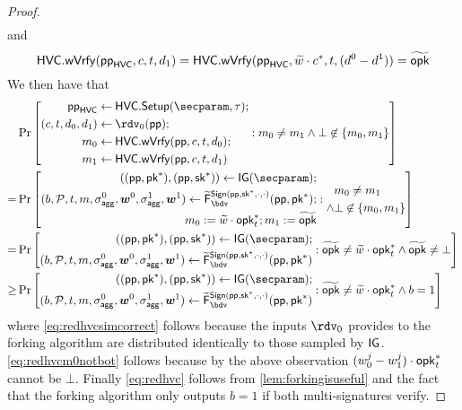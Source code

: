 \begin{proof}
\begin{align*}
  \end{align*}
  and
  \[
    \mathsf{HVC}.\mathsf{wVrfy}(\mathsf{pp}_{\mathsf{HVC}},c,t,d_1) = \mathsf{HVC}.\mathsf{wVrfy}(\mathsf{pp}_{\mathsf{HVC}},\widetilde w\cdot c^*,t,(d^0-d^1)) = \widetilde{\mathsf{opk}}
  \]
  We then have that
    \begin{align}
    &\Pr\left[
      \begin{aligned}
      \hvcparams\gets&\mspace{\medmuskip}\hvc.\setup(\secparam,\tau);\\
      (c,t,d_0,d_1) \gets&\mspace{\medmuskip} \rdv_0(\params);\\
      m_0 \gets&\mspace{\medmuskip} \hvc.\wverify(\params,c,t,d_0);\\
      m_1 \gets&\mspace{\medmuskip} \hvc.\wverify(\params,c,t,d_1)
      \end{aligned}:
      m_0\neq m_1 \land\bot\not\in\{m_0,m_1\}
    \right]\notag\\
    =&\Pr\left[
      \begin{aligned}
      ((\params,\pk^*),(\params,\sk^*)) \gets \IG(\secparam);\\
      (b,\pubkeys,t,m,\aggsig^0,\vec{w}^0,\aggsig^1,\vec{w}^1)\gets \widetilde\fork^{\sign(\params,\sk^*,\cdot,\cdot)}_\bdv(\params,\pk^*);\\
      m_0 := \widetilde w\cdot \opk^*_t;
      m_1 := \widetilde\opk
      \end{aligned}:
      \begin{aligned}
      &m_0\neq m_1\\ \land&\bot\not\in\{m_0,m_1\}
      \end{aligned}
    \right]\label{eq:redhvcsimcorrect}\\
    =&\Pr\left[
      \begin{aligned}
      ((\params,\pk^*),(\params,\sk^*)) \gets \IG(\secparam);\\
      (b,\pubkeys,t,m,\aggsig^0,\vec{w}^0,\aggsig^1,\vec{w}^1)\gets \widetilde\fork^{\sign(\params,\sk^*,\cdot,\cdot)}_\bdv(\params,\pk^*)
      \end{aligned}:
      \widetilde\opk \neq \widetilde w\cdot \opk^*_t \land \widetilde\opk \neq \bot
    \right]\label{eq:redhvcm0notbot}\\
    \geq&\Pr\left[
      \begin{aligned}
      ((\params,\pk^*),(\params,\sk^*)) \gets \IG(\secparam);\\
      (b,\pubkeys,t,m,\aggsig^0,\vec{w}^0,\aggsig^1,\vec{w}^1)\gets \widetilde\fork^{\sign(\params,\sk^*,\cdot,\cdot)}_\bdv(\params,\pk^*)
      \end{aligned}:
      \widetilde\opk \neq \widetilde w\cdot \opk^*_t \land b=1
    \right]\label{eq:redhvc}
  \end{align}
  where \autoref{eq:redhvcsimcorrect} follows because the inputs $\rdv_0$ provides to the forking algorithm are distributed identically to those sampled by $\mathsf{IG}$.
  \autoref{eq:redhvcm0notbot} follows because by the above observation $(w^j_0-w^j_1)\cdot\mathsf{opk}^*_t$ cannot be $\bot$.
  Finally \autoref{eq:redhvc} follows from \autoref{lem:forkingisuseful} and the fact that the forking algorithm only outputs $b=1$ if both multi-signatures verify.
  

\end{proof}

